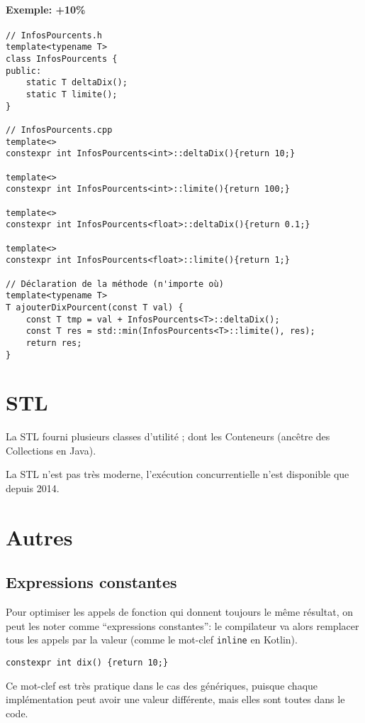 \documentclass[10pt,a4paper,french]{article}
\begin{document}
\paragraph{Exemple: +10\%}
\begin{verbatim}
// InfosPourcents.h
template<typename T>
class InfosPourcents {
public:
    static T deltaDix();
    static T limite();
}

// InfosPourcents.cpp
template<>
constexpr int InfosPourcents<int>::deltaDix(){return 10;}

template<>
constexpr int InfosPourcents<int>::limite(){return 100;}

template<>
constexpr int InfosPourcents<float>::deltaDix(){return 0.1;}

template<>
constexpr int InfosPourcents<float>::limite(){return 1;}

// Déclaration de la méthode (n'importe où)
template<typename T>
T ajouterDixPourcent(const T val) {
    const T tmp = val + InfosPourcents<T>::deltaDix();
    const T res = std::min(InfosPourcents<T>::limite(), res);
    return res;
}
\end{verbatim}

\section{STL}

La STL fourni plusieurs classes d'utilité ; dont les Conteneurs (ancêtre des Collections en Java).

La STL n'est pas très moderne, l'exécution concurrentielle n'est disponible que depuis 2014.

\section{Autres}

\subsection{Expressions constantes}

Pour optimiser les appels de fonction qui donnent toujours le même résultat, on peut les noter comme ``expressions constantes'': le compilateur va alors remplacer tous les appels par la valeur (comme le mot-clef \texttt{inline} en Kotlin).

\begin{verbatim}
constexpr int dix() {return 10;}
\end{verbatim}

Ce mot-clef est très pratique dans le cas des génériques, puisque chaque implémentation peut avoir une valeur différente, mais elles sont toutes dans le code.

\appendix %

\end{document}
